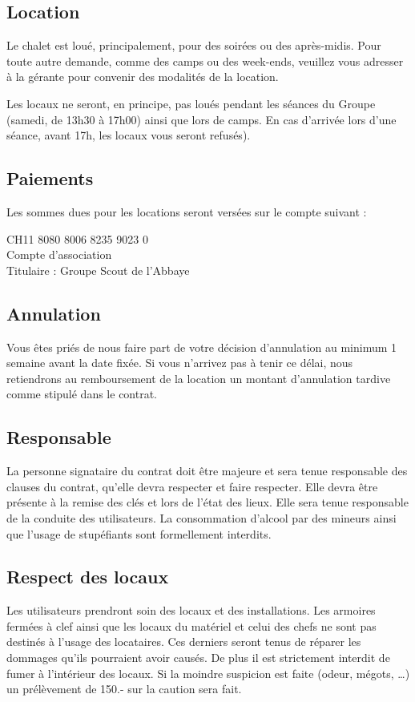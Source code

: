 \documentclass[a4paper,12pt]{extarticle}
\begin{document}
\subsection{Location}

Le chalet est loué, principalement, pour des soirées ou des après-midis.
Pour toute autre demande, comme des camps ou des week-ends, veuillez vous adresser à la gérante pour convenir des modalités de la location.

{\color{red} Les locaux ne seront, en principe, pas loués pendant les séances du Groupe (samedi, de 13h30 à 17h00) ainsi que lors de camps. En cas d'arrivée lors d'une séance, avant 17h, les locaux vous seront refusés). }

\subsection{Paiements}
Les sommes dues pour les locations seront versées sur le compte suivant :

CH11 8080 8006 8235 9023 0 \\
Compte d'association \\
Titulaire : Groupe Scout de l'Abbaye \\

\subsection{Annulation}

Vous êtes priés de nous faire part de votre décision d'annulation au minimum 1 semaine avant la date fixée.
Si vous n'arrivez pas à tenir ce délai, nous retiendrons au remboursement de la location un montant d'annulation tardive comme stipulé dans le contrat.

\subsection{Responsable}
La personne signataire du contrat doit être majeure et sera tenue responsable des clauses du contrat, qu'elle devra respecter et faire respecter.
Elle devra être présente à la remise des clés et lors de l'état des lieux. Elle sera tenue responsable de la conduite des utilisateurs.
La consommation d'alcool par des mineurs ainsi que l'usage de stupéfiants sont formellement interdits.

\subsection{Respect des locaux}
Les utilisateurs prendront soin des locaux et des installations.
Les armoires fermées à clef ainsi que les locaux du matériel et celui des chefs ne sont pas destinés à l'usage des locataires.
Ces derniers seront tenus de réparer les dommages qu'ils pourraient avoir causés.
De plus {\color{red} il est strictement interdit de fumer à l'intérieur des locaux.}
Si la moindre suspicion est faite (odeur, mégots, …) un prélèvement de 150.- sur la caution sera fait.
\end{document}
